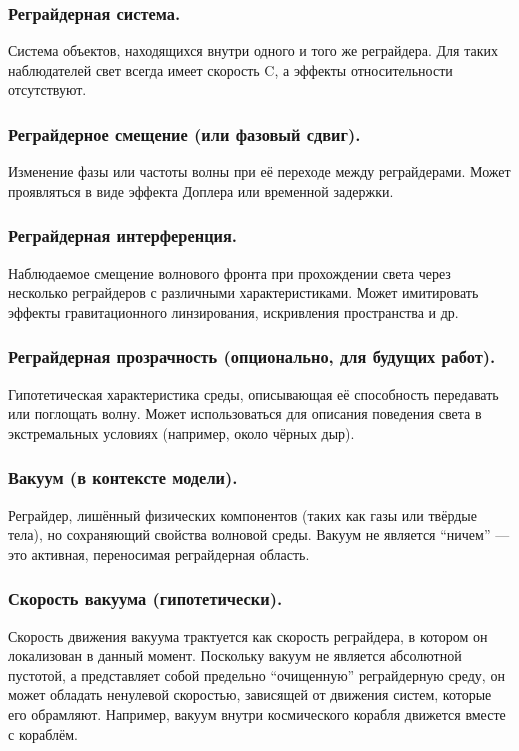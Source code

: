 \documentclass[12pt]{article}
\begin{document}
\subsubsection*{Реграйдерная система.}
Система объектов, находящихся внутри одного и того же реграйдера. Для таких наблюдателей свет всегда имеет скорость C, а эффекты относительности отсутствуют.

\subsubsection*{Реграйдерное смещение (или фазовый сдвиг).}
Изменение фазы или частоты волны при её переходе между реграйдерами. Может проявляться в виде эффекта Доплера или временной задержки.

\subsubsection*{Реграйдерная интерференция.}
Наблюдаемое смещение волнового фронта при прохождении света через несколько реграйдеров с различными характеристиками. Может имитировать эффекты гравитационного линзирования, искривления пространства и др.

\subsubsection*{Реграйдерная прозрачность (опционально, для будущих работ).}
Гипотетическая характеристика среды, описывающая её способность передавать или поглощать волну. Может использоваться для описания поведения света в экстремальных условиях (например, около чёрных дыр).

\subsubsection*{Вакуум (в контексте модели).}
Реграйдер, лишённый физических компонентов (таких как газы или твёрдые тела), но сохраняющий свойства волновой среды. Вакуум не является “ничем” — это активная, переносимая реграйдерная область.

\subsubsection*{Скорость вакуума (гипотетически).}
Скорость движения вакуума трактуется как скорость реграйдера, в котором он локализован в данный момент. Поскольку вакуум не является абсолютной пустотой, а представляет собой предельно “очищенную” реграйдерную среду, он может обладать ненулевой скоростью, зависящей от движения систем, которые его обрамляют. Например, вакуум внутри космического корабля движется вместе с кораблём.
\end{document}
